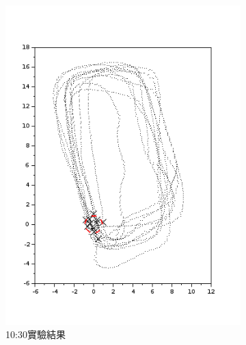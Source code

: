 \begin{figure}[h!]
	\centering
	\begin{subfigure}[t]{0.32\textwidth}
		\includegraphics[width=\textwidth]{figures/appendix1/dynamic_4}
		\caption{10:30實驗結果}
		\label{f:app:dynamic_4}
	\end{subfigure}
	\begin{subfigure}[t]{0.32\textwidth}

\end{subfigure}
\end{figure}
